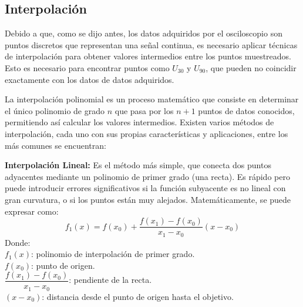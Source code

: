 \subsection{Interpolación}
Debido a que, como se dijo antes, los datos adquiridos por el osciloscopio son puntos discretos que representan una señal continua, es necesario aplicar técnicas de interpolación para obtener valores intermedios entre los puntos muestreados. Esto es necesario para encontrar puntos como $U_{30}$ y $U_{90}$, que pueden no coincidir exactamente con los datos de datos adquiridos.\par
La interpolación polinomial es un proceso matemático que consiste en determinar el único polinomio de grado $n$ que pasa por los $n+1$ puntos de datos conocidos, permitiendo así calcular los valores intermedios. Existen varios métodos de interpolación, cada uno con sus propias características y aplicaciones, entre los más comunes se encuentran:\par
\textbf{Interpolación Lineal:} Es el método más simple, que conecta dos puntos adyacentes mediante un polinomio de primer grado (una recta). Es rápido pero puede introducir errores significativos si la función subyacente es no lineal con gran curvatura, o si los puntos están muy alejados. Matemáticamente, se puede expresar como:
\begin{equation}
    f_1(x) = f(x_0) + \frac{f(x_1) - f(x_0)}{x_1 - x_0} (x - x_0)
\end{equation}
Donde:\\
$f_1(x)$: polinomio de interpolación de primer grado.\\
$f(x_0)$: punto de origen.\\
$\dfrac{f(x_1) - f(x_0)}{x_1 - x_0}$: pendiente de la recta.\\
$(x - x_0)$: distancia desde el punto de origen hasta el objetivo.

